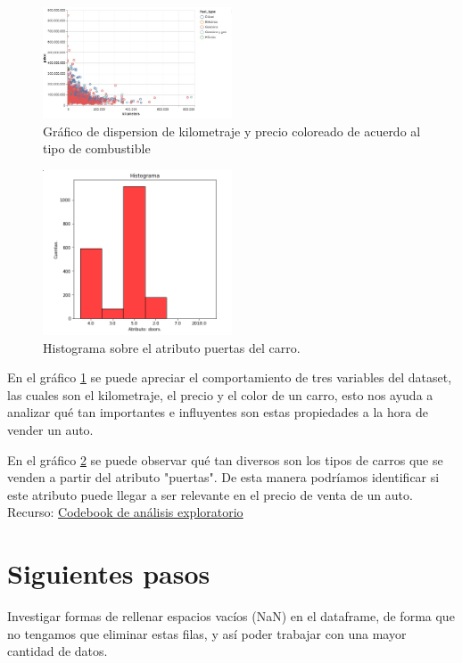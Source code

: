 \documentclass[journal]{..//IEEEtran/IEEEtran}
\begin{document}
\begin{figure}[H]
    \centering
    \includegraphics[width=0.5\textwidth]{images/dispersion.jpeg}
    \caption{Gráfico de dispersion de kilometraje y precio coloreado de acuerdo al tipo de combustible }
    \label{diagramaD}
    \end{figure}
\begin{figure}[H]
    \centering
    \includegraphics[width=0.5\textwidth]{images/histograma.PNG}
    \caption{Histograma sobre el atributo puertas del carro.}
    \label{histograma1}
\end{figure}



En el gráfico \ref{diagramaD} se puede apreciar el comportamiento de tres variables del dataset, las cuales son el kilometraje, el precio y el color de un carro, esto nos ayuda a analizar qué tan importantes e influyentes son estas propiedades a la hora de vender un auto.

En el gráfico \ref{histograma1} se puede observar qué tan diversos son los tipos de carros que se venden a partir del atributo "puertas". De esta manera podríamos identificar si este atributo puede llegar a ser relevante en el precio de venta de un auto. \\

Recurso: 
\textcolor{Micolor1}{\href{https://colab.research.google.com/drive/1JEJDNylgwW9VSxS-4pY8_b2a_9Aqz3Hw?usp=sharin}{Codebook de análisis exploratorio}}

\section{Siguientes pasos}
Investigar formas de rellenar espacios vacíos (NaN) en el dataframe, de forma que no tengamos que eliminar estas filas, y así poder trabajar con una mayor cantidad de datos.\\
\end{document}
